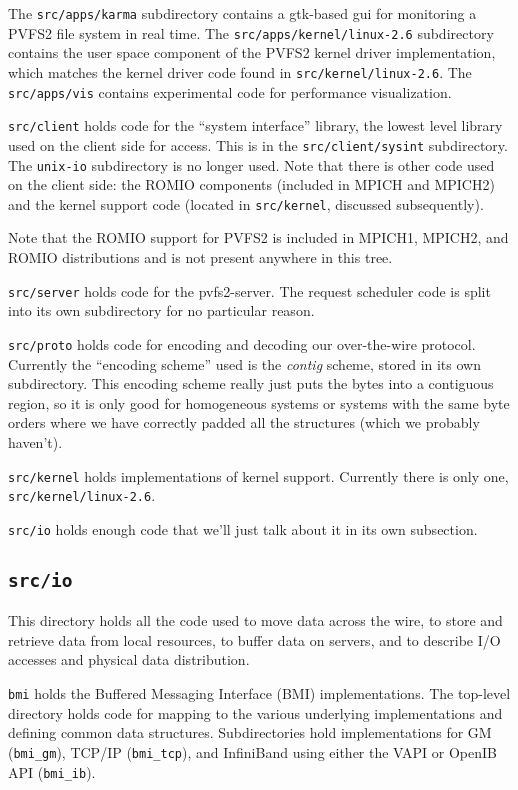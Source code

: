 The \texttt{src/apps/karma} subdirectory contains a gtk-based
gui for monitoring a PVFS2 file system in real time.  The
\texttt{src/apps/kernel/linux-2.6} subdirectory contains the
user space component of the PVFS2 kernel driver implementation, which
matches the kernel driver code found in \texttt{src/kernel/linux-2.6}.
The \texttt{src/apps/vis} contains experimental code for performance
visualization.

\texttt{src/client} holds code for the ``system interface'' library, the
lowest level library used on the client side for access.  This is in the
\texttt{src/client/sysint} subdirectory.  The \texttt{unix-io} subdirectory is
no longer used.  Note that there is other code used on the client side: the
ROMIO components (included in MPICH and MPICH2) and the kernel support code
(located in \texttt{src/kernel}, discussed subsequently).

Note that the ROMIO support for PVFS2 is included in MPICH1, MPICH2, and ROMIO
distributions and is not present anywhere in this tree.

\texttt{src/server} holds code for the pvfs2-server.  The request scheduler
code is split into its own subdirectory for no particular reason.

\texttt{src/proto} holds code for encoding and decoding our over-the-wire
protocol.  Currently the ``encoding scheme'' used is the \emph{contig}
scheme, stored in its own subdirectory.  This encoding scheme really just puts
the bytes into a contiguous region, so it is only good for homogeneous systems
or systems with the same byte orders where we have correctly padded all the
structures (which we probably haven't).

\texttt{src/kernel} holds implementations of kernel support.  Currently there
is only one, \texttt{src/kernel/linux-2.6}.

\texttt{src/io} holds enough code that we'll just talk about it in its own
subsection.

\subsection{\texttt{src/io}}

This directory holds all the code used to move data across the wire, to store
and retrieve data from local resources, to buffer data on servers, and to
describe I/O accesses and physical data distribution.

\texttt{bmi} holds the Buffered Messaging Interface (BMI) implementations.
The top-level directory holds code for mapping to the various underlying
implementations and defining common data structures.  Subdirectories hold
implementations for GM (\texttt{bmi\_gm}), TCP/IP (\texttt{bmi\_tcp}), and
InfiniBand using either the VAPI or OpenIB API (\texttt{bmi\_ib}).

